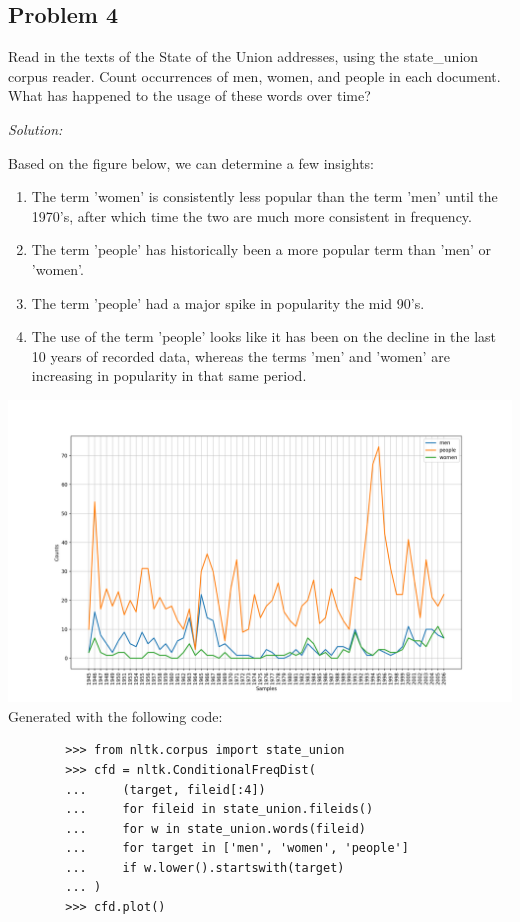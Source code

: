 \documentclass[11pt]{article}
\newenvironment{solution}{
	\vspace{10px}\noindent\emph{Solution:}
}{
	\vspace{10px}
}
\begin{document}
\subsection*{Problem 4}
Read in the texts of the State of the Union addresses, using the state\_union corpus reader. Count occurrences of men, women, and people in each document. What has happened to the usage of these words over time?

\begin{solution}
	Based on the figure below, we can determine a few insights: 
	\begin{enumerate}
		
		\item The term 'women' is consistently less popular than the term 'men' until the 1970's, after which time the two are much more consistent in frequency.
		
		\item The term 'people' has historically been a more popular term than 'men' or 'women'.
		
		\item The term 'people' had a major spike in popularity the mid 90's.
		
		\item The use of the term 'people' looks like it has been on the decline in the last 10 years of recorded data, whereas the terms 'men' and 'women' are increasing in popularity in that same period.
	\end{enumerate}
	\hspace*{-50pt}
	\includegraphics[width=550pt]{state_of_the_union_comp_men_people_women.png}
	Generated with the following code:
	\begin{lstlisting}
		>>> from nltk.corpus import state_union
		>>> cfd = nltk.ConditionalFreqDist(
		...     (target, fileid[:4])
		...     for fileid in state_union.fileids()
		...     for w in state_union.words(fileid)
		...     for target in ['men', 'women', 'people']
		...     if w.lower().startswith(target)
		... )
		>>> cfd.plot()
	\end{lstlisting}
\end{solution}  
\end{document}
